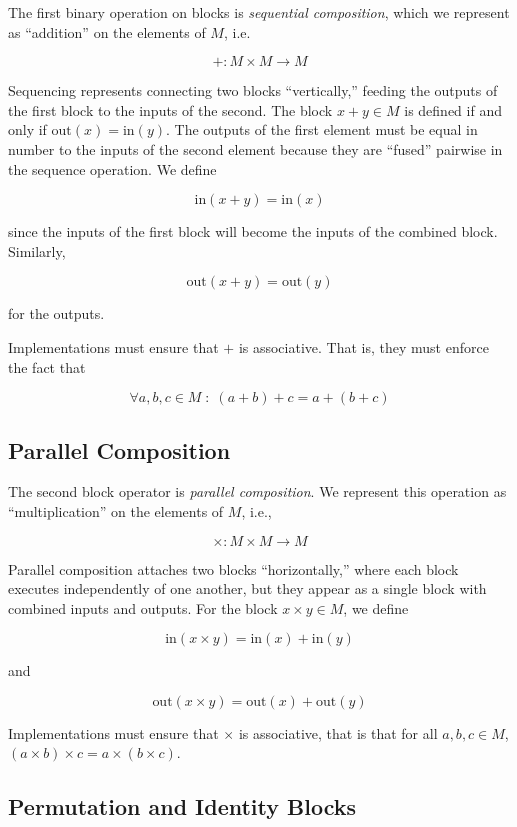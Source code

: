The first binary operation on blocks is \emph{sequential
composition}, which we represent as ``addition'' on the elements
of $M$, i.e.

\[
+ : M \times M \to M
\]

Sequencing represents connecting two blocks ``vertically,''
feeding the outputs of the first block to the inputs of the
second. The block $x+y \in M$ is defined if and only if
$\mbox{out}(x) = \mbox{in}(y)$. The outputs of the first element
must be equal in number to the inputs of the second element
because they are ``fused'' pairwise in the sequence operation. We
define

\[
\mbox{in}(x+y) = \mbox{in}(x)
\]

since the inputs of the first block will become the inputs of the
combined block. Similarly,

\[
\mbox{out}(x+y) = \mbox{out}(y)
\]

for the outputs.

Implementations must ensure that $+$ is associative. That is, they
must enforce the fact that

\[
\forall a,b,c \in M \;:\; (a+b)+c = a + (b+c)
\]

\subsection{Parallel Composition}
\label{sec:code-gen:par}

The second block operator is \emph{parallel composition}. We
represent this operation as ``multiplication'' on the elements of
$M$, i.e.,

\[
\times : M \times M \to M
\]

Parallel composition attaches two blocks ``horizontally,'' where
each block executes independently of one another, but they appear
as a single block with combined inputs and outputs. For the block
$x\times y \in M$, we define

\[
\mbox{in} (x \times y) = \mbox{in}(x)+\mbox{in}(y)
\]

and

\[
\mbox{out}(x \times y) = \mbox{out}(x) + \mbox{out}(y)
\]

Implementations must ensure that $\times$ is associative, that is
that for all $a,b,c \in M$, $(a \times b) \times c = a \times (b
\times c)$.

\subsection{Permutation and Identity Blocks}
\label{sec:code-gen:special}

